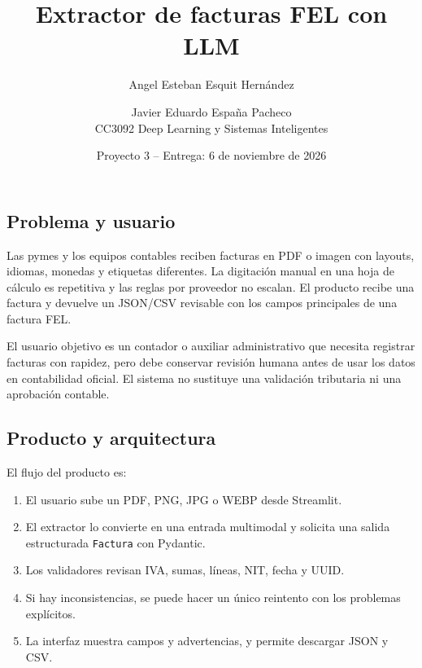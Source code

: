 \documentclass[11pt,a4paper]{article}
\title{Extractor de facturas FEL con LLM}
\author{Angel Esteban Esquit Hernández \and Javier Eduardo España Pacheco\\CC3092 Deep Learning y Sistemas Inteligentes}
\date{Proyecto 3 -- Entrega: 6 de noviembre de 2026}
\begin{document}
\maketitle
\tableofcontents
\newpage
\setcounter{section}{2}

\subsection{Problema y usuario}
Las pymes y los equipos contables reciben facturas en PDF o imagen con layouts, idiomas, monedas y etiquetas diferentes. La digitación manual en una hoja de cálculo es repetitiva y las reglas por proveedor no escalan. El producto recibe una factura y devuelve un JSON/CSV revisable con los campos principales de una factura FEL.

El usuario objetivo es un contador o auxiliar administrativo que necesita registrar facturas con rapidez, pero debe conservar revisión humana antes de usar los datos en contabilidad oficial. El sistema no sustituye una validación tributaria ni una aprobación contable.

\subsection{Producto y arquitectura}
El flujo del producto es:
\begin{enumerate}
  \item El usuario sube un PDF, PNG, JPG o WEBP desde Streamlit.
  \item El extractor lo convierte en una entrada multimodal y solicita una salida estructurada \texttt{Factura} con Pydantic.
  \item Los validadores revisan IVA, sumas, líneas, NIT, fecha y UUID.
  \item Si hay inconsistencias, se puede hacer un único reintento con los problemas explícitos.
  \item La interfaz muestra campos y advertencias, y permite descargar JSON y CSV.
\end{enumerate}
\end{document}
